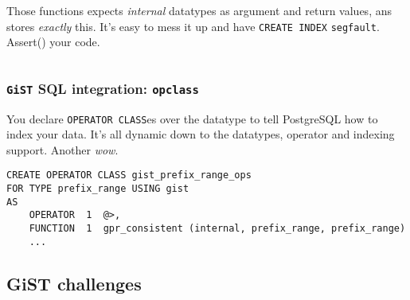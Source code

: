 \documentclass{beamer}
\begin{document}
\begin{frame}[fragile]
\begin{columns}[c]
\begin{overprint}

  Those functions expects \textit{internal} datatypes as argument and return
  values, ans stores \textit{exactly} this.
  \linebreak
  \linebreak
  It's easy to mess it up and have \texttt{CREATE INDEX}
  \texttt{segfault}. \alert{Assert()} your code.

  \end{overprint}

\end{columns}
\end{frame}

\begin{frame}[fragile]
  \frametitle{\texttt{GiST} SQL integration: \texttt{opclass}}

  You declare \texttt{OPERATOR CLASS}es over the datatype to tell PostgreSQL
  how to index your data. It's all dynamic down to the datatypes, operator
  and indexing support. Another \textit{wow}.

  \pause

  \begin{example}
  \begin{verbatim}
CREATE OPERATOR CLASS gist_prefix_range_ops
FOR TYPE prefix_range USING gist 
AS
    OPERATOR  1  @>,
    FUNCTION  1  gpr_consistent (internal, prefix_range, prefix_range)
    ...
  \end{verbatim}
  \end{example}
\end{frame}


\subsection{GiST challenges}
\end{document}
